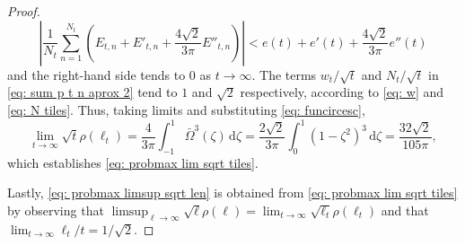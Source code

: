 \documentclass[12pt, a4paper]{article}
\newcommand{\diff}{\mathrm d}
\newcommand{\probmax}{\rho} %
\newcommand{\len}{\ell} %
\newcommand{\tiles}{t} %
\newcommand{\funcircesc}{\bar \Omega}
\begin{document}
\begin{proof}
\begin{equation}
\left| \frac 1 {N_\tiles} \sum_{n=1}^{N_\tiles} \left(E_{\tiles,n} + E'_{\tiles,n} + \frac{4 \sqrt{2}} {3\pi} E''_{\tiles,n} \right) \right| < e(\tiles)+e'(\tiles) + \frac{4 \sqrt{2}} {3\pi} e''(\tiles)
\end{equation}
and the right-hand side tends to $0$ as $\tiles \rightarrow \infty$. The terms $w_\tiles/\sqrt{\tiles}$ and $N_\tiles/\sqrt{\tiles}$ in \eqref{eq: sum p t n aprox 2} tend to $1$ and $\sqrt{2}$ respectively, according to \eqref{eq: w} and \eqref{eq: N tiles}. Thus, taking limits and substituting \eqref{eq: funcircesc},
\begin{equation}
\label{eq: sum p t n lim}
\lim_{\tiles \rightarrow \infty} \sqrt{\tiles} \probmax(\len_\tiles) =
\frac{4} {3\pi} \int_{-1}^1 \funcircesc^3(\zeta) \,\diff \zeta = \frac{2\sqrt{2}} {3\pi} \int_{0}^1 (1-\zeta^2)^3 \,\diff \zeta = \frac{32\sqrt{2}} {105\pi},
\end{equation}
which establishes \eqref{eq: probmax lim sqrt tiles}.

Lastly, \eqref{eq: probmax limsup sqrt len} is obtained from \eqref{eq: probmax lim sqrt tiles} by observing that $\limsup_{\len \rightarrow \infty} \sqrt{\len} \probmax(\len) = \lim_{\tiles \rightarrow \infty} \sqrt{\len_\tiles} \probmax(\len_\tiles)$ and that $ \lim_{\tiles \rightarrow \infty} \len_\tiles/\tiles = 1 / \sqrt{2}$.
\end{proof}




\end{document}
